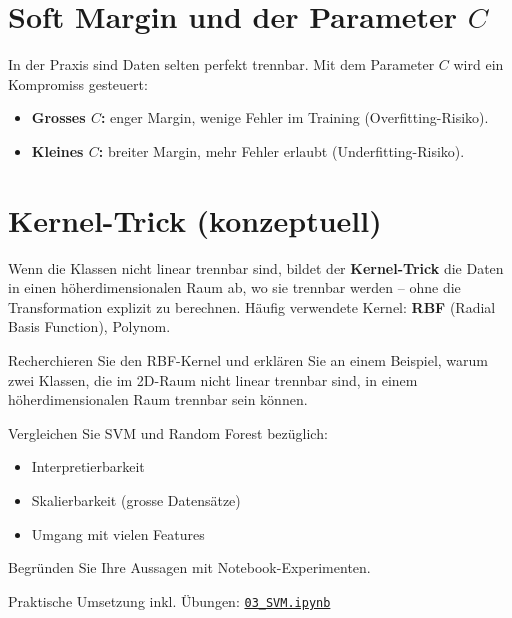 \section{Soft Margin und der Parameter \texorpdfstring{$C$}{C}}

In der Praxis sind Daten selten perfekt trennbar.
Mit dem Parameter $C$ wird ein Kompromiss gesteuert:
\begin{itemize}
    \item \textbf{Grosses $C$:} enger Margin, wenige Fehler im Training (Overfitting-Risiko).
    \item \textbf{Kleines $C$:} breiter Margin, mehr Fehler erlaubt (Underfitting-Risiko).
\end{itemize}

\section{Kernel-Trick (konzeptuell)}

\begin{mydefinition}
Wenn die Klassen nicht linear trennbar sind, bildet der \textbf{Kernel-Trick}
die Daten in einen höher\-dimensionalen Raum ab, wo sie trennbar werden --
ohne die Transformation explizit zu berechnen.
Häufig verwendete Kernel: \textbf{RBF} (Radial Basis Function), Polynom.
\end{mydefinition}

\begin{myexercise}
Recherchieren Sie den RBF-Kernel und erklären Sie an einem Beispiel,
warum zwei Klassen, die im 2D-Raum nicht linear trennbar sind,
in einem höherdimensionalen Raum trennbar sein können.
\end{myexercise}

\begin{mychallenge}
Vergleichen Sie SVM und Random Forest bezüglich:
\begin{itemize}
    \item Interpretierbarkeit
    \item Skalierbarkeit (grosse Datensätze)
    \item Umgang mit vielen Features
\end{itemize}
Begründen Sie Ihre Aussagen mit Notebook-Experimenten.
\end{mychallenge}

\begin{myremark}[Notebook]
Praktische Umsetzung inkl. Übungen:
\href{\notebookbaseurl03_SVM_Classification.ipynb}{\texttt{03\_SVM.ipynb}}
\end{myremark}

